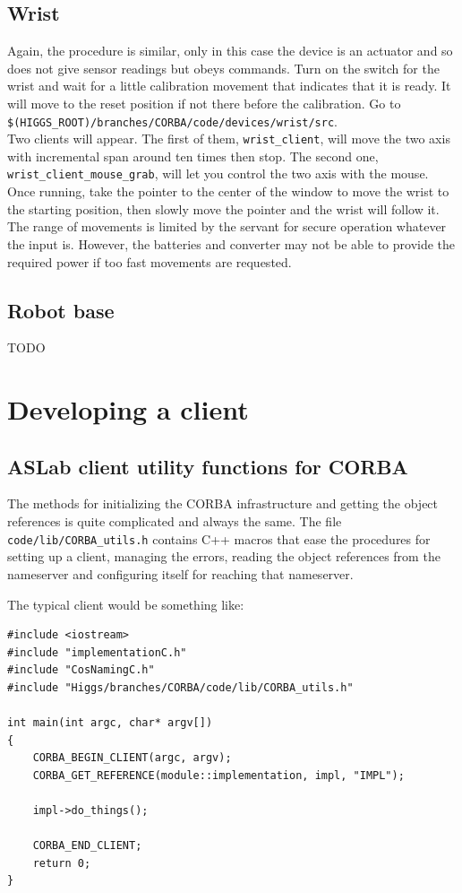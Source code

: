 \subsection{Wrist}
Again, the procedure is similar, only in this case the device is an actuator and so does not give sensor readings but obeys commands. Turn on the switch for the wrist and wait for a little calibration movement that indicates that it is ready. It will move to the reset position if not there before the calibration.
Go to \\ \texttt{\$(HIGGS\_ROOT)/branches/CORBA/code/devices/wrist/src}. \\ Two clients will appear. The first of them, \texttt{wrist\_client}, will move the two axis with incremental span around ten times then stop. The second one, \\ \texttt{wrist\_client\_mouse\_grab}, will let you control the two axis with the mouse. Once running, take the pointer to the center of the window to move the wrist to the starting position, then slowly move the pointer and the wrist will follow it. The range of movements is limited by the servant for secure operation whatever the input is. However, the batteries and converter may not be able to provide the required power if too fast movements are requested.

\subsection{Robot base}
TODO

\section{Developing a client}
\label{sec:dev_client}


\subsection{ASLab client utility functions for CORBA}
The methods for initializing the CORBA infrastructure and getting the object references is quite complicated and always the same. The file \\
\texttt{code/lib/CORBA\_utils.h} contains C++ macros that ease the procedures for setting up a client, managing the errors, reading the object references from the nameserver and configuring itself for reaching that nameserver.

The typical client would be something like:

\begin{verbatim}
#include <iostream>
#include "implementationC.h"
#include "CosNamingC.h"
#include "Higgs/branches/CORBA/code/lib/CORBA_utils.h"

int main(int argc, char* argv[])
{
    CORBA_BEGIN_CLIENT(argc, argv);
    CORBA_GET_REFERENCE(module::implementation, impl, "IMPL");

    impl->do_things();

    CORBA_END_CLIENT;
    return 0;
}
\end{verbatim} 

